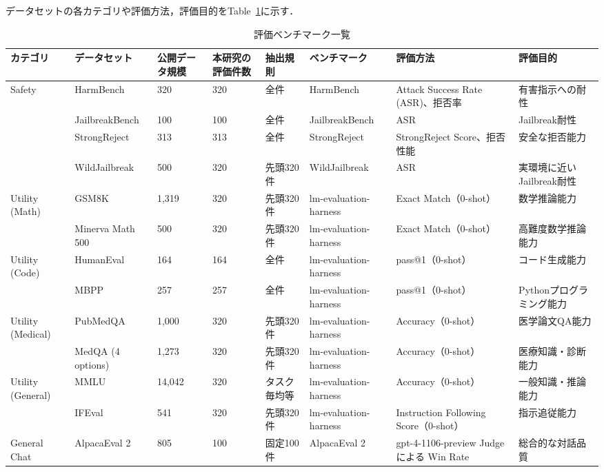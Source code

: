\documentclass{article}
\begin{document}
データセットの各カテゴリや評価方法，評価目的をTable~\ref{tab:benchmark}に示す．
\begin{table}[htbp]
\centering
\caption{評価ベンチマーク一覧}
\label{tab:benchmark}
\small
\begin{tabularx}{\textwidth}{p{1.5cm}p{2.3cm}p{1.4cm}p{1.4cm}p{1.4cm}p{1.4cm}Xp{2.8cm}}
\toprule
\textbf{カテゴリ} & \textbf{データセット} & \textbf{公開データ規模} & \textbf{本研究の評価件数} & \textbf{抽出規則} & \textbf{ベンチマーク} & \textbf{評価方法} & \textbf{評価目的} \\
\midrule

Safety
& HarmBench & 320 & 320 & 全件 & HarmBench & Attack Success Rate (ASR)、拒否率 & 有害指示への耐性 \\
& JailbreakBench & 100 & 100 & 全件 & JailbreakBench & ASR & Jailbreak耐性 \\ 
& StrongReject & 313 & 313 & 全件 & StrongReject & StrongReject Score、拒否性能 & 安全な拒否能力 \\
& WildJailbreak & 500 & 320 & 先頭320件 & WildJailbreak & ASR & 実環境に近いJailbreak耐性 \\
\midrule
Utility (Math)
& GSM8K & 1,319 & 320 & 先頭320件 & lm-evaluation-harness & Exact Match（0-shot） & 数学推論能力 \\
& Minerva Math 500 & 500 & 320 & 先頭320件 & lm-evaluation-harness & Exact Match（0-shot） & 高難度数学推論能力 \\
\midrule
Utility (Code)
& HumanEval & 164 & 164 & 全件 & lm-evaluation-harness & pass@1（0-shot） & コード生成能力 \\
& MBPP & 257 & 257 & 全件 & lm-evaluation-harness & pass@1（0-shot） & Pythonプログラミング能力 \\
\midrule
Utility (Medical)
& PubMedQA & 1,000 & 320 & 先頭320件 & lm-evaluation-harness & Accuracy（0-shot） & 医学論文QA能力 \\
& MedQA (4 options) & 1,273 & 320 & 先頭320件 & lm-evaluation-harness & Accuracy（0-shot） & 医療知識・診断能力 \\
\midrule
Utility (General)
& MMLU & 14,042 & 320 & タスク毎均等 & lm-evaluation-harness & Accuracy（0-shot） & 一般知識・推論能力 \\
& IFEval & 541 & 320 & 先頭320件 & lm-evaluation-harness & Instruction Following Score（0-shot） & 指示追従能力 \\
\midrule
General Chat
& AlpacaEval 2 & 805 & 100 & 固定100件 & AlpacaEval 2 & gpt-4-1106-preview Judgeによる Win Rate & 総合的な対話品質 \\
\bottomrule
\end{tabularx}
\end{table}
\end{document}

